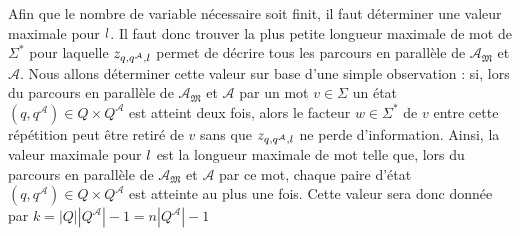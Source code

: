 \documentclass[12pt,a4paper,oneside,titlepage]{report}
\begin{document}
\noindent Afin que le nombre de variable nécessaire soit finit, il faut déterminer une valeur maximale pour $\mathnormal{l}$. Il faut donc trouver la plus petite longueur maximale de mot de $\Sigma^*$ pour laquelle $z_{q,q^\mathcal{A},\mathnormal{l}}$ permet de décrire tous les parcours en  parallèle de $\mathcal{A}_\mathfrak{M}$ et $\mathcal{A}$. Nous allons déterminer cette valeur sur base d'une simple observation : si, lors du parcours en parallèle de $\mathcal{A}_\mathfrak{M}$ et $\mathcal{A}$ par un mot $v\in\Sigma$ un état $(q,q^\mathcal{A})\in Q\times Q^\mathcal{A}$ est atteint deux fois, alors le facteur $w\in\Sigma^*$ de $v$ entre cette répétition peut être retiré de $v$ sans que $z_{q,q^\mathcal{A},\mathnormal{l}}$ ne perde d'information. Ainsi, la valeur maximale pour $\mathnormal{l}$ est la longueur maximale de mot telle que, lors du parcours en parallèle de $\mathcal{A}_\mathfrak{M}$ et $\mathcal{A}$ par ce mot, chaque paire d'état $(q,q^\mathcal{A})\in Q\times Q^\mathcal{A}$ est atteinte au plus une fois. Cette valeur sera donc donnée par $k=|Q||Q^\mathcal{A}|-1=n|Q^\mathcal{A}|-1$\\
\end{document}
